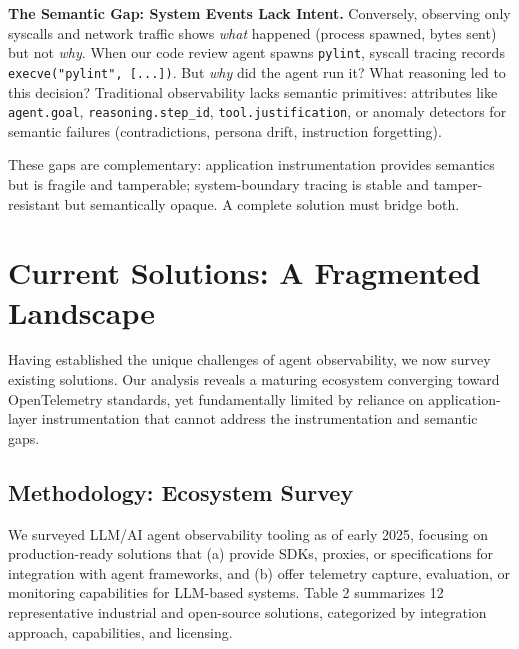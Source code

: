 \documentclass[sigplan,screen,9pt]{acmart}
\begin{document}
\textbf{The Semantic Gap: System Events Lack Intent.} Conversely, observing only syscalls and network traffic shows \emph{what} happened (process spawned, bytes sent) but not \emph{why}. When our code review agent spawns \texttt{pylint}, syscall tracing records \texttt{execve("pylint", [...])}. But \emph{why} did the agent run it? What reasoning led to this decision? Traditional observability lacks semantic primitives: attributes like \texttt{agent.goal}, \texttt{reasoning.step\_id}, \texttt{tool.justification}, or anomaly detectors for semantic failures (contradictions, persona drift, instruction forgetting).

These gaps are complementary: application instrumentation provides semantics but is fragile and tamperable; system-boundary tracing is stable and tamper-resistant but semantically opaque. A complete solution must bridge both.

\section{Current Solutions: A Fragmented Landscape}

Having established the unique challenges of agent observability, we now survey existing solutions. Our analysis reveals a maturing ecosystem converging toward OpenTelemetry standards, yet fundamentally limited by reliance on application-layer instrumentation that cannot address the instrumentation and semantic gaps.

\subsection{Methodology: Ecosystem Survey}

We surveyed LLM/AI agent observability tooling as of early 2025, focusing on production-ready solutions that (a) provide SDKs, proxies, or specifications for integration with agent frameworks, and (b) offer telemetry capture, evaluation, or monitoring capabilities for LLM-based systems. Table 2 summarizes 12 representative industrial and open-source solutions, categorized by integration approach, capabilities, and licensing.
\end{document}
